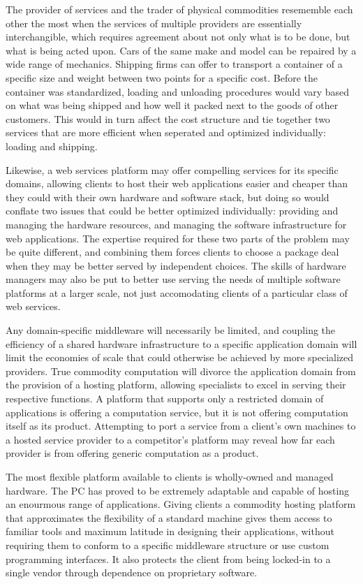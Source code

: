 The provider of services and the trader of physical commodities resememble each other the most when the services of multiple providers are essentially interchangible, which requires agreement about not only what is to be done, but what is being acted upon. Cars of the same make and model can be repaired by a wide range of mechanics. Shipping firms can offer to transport a container of a specific size and weight between two points for a specific cost. Before the container was standardized, loading and unloading procedures would vary based on what was being shipped and how well it packed next to the goods of other customers. This would in turn affect the cost structure and tie together two services that are more efficient when seperated and optimized individually: loading and shipping.

Likewise, a web services platform may offer compelling services for its specific domains, allowing clients to host their web applications easier and cheaper than they could with their own hardware and software stack, but doing so would conflate two issues that could be better optimized individually: providing and managing the hardware resources, and managing the software infrastructure for web applications. The expertise required for these two parts of the problem may be quite different, and combining them forces clients to choose a package deal when they may be better served by independent choices. The skills of hardware managers may also be put to better use serving the needs of multiple software platforms at a larger scale, not just accomodating clients of a particular class of web services.

Any domain-specific middleware will necessarily be limited, and coupling the efficiency of a shared hardware infrastructure to a specific application domain will limit the economies of scale that could otherwise be achieved by more specialized providers. True commodity computation will divorce the application domain from the provision of a hosting platform, allowing specialists to excel in serving their respective functions. A platform that supports only a restricted domain of applications is offering a computation service, but it is not offering computation itself as its product. Attempting to port a service from a client's own machines to a hosted service provider to a competitor's platform may reveal how far each provider is from offering generic computation as a product.

The most flexible platform available to clients is wholly-owned and managed hardware. The PC has proved to be extremely adaptable and capable of hosting an enourmous range of applications. Giving clients a commodity hosting platform that approximates the flexibility of a standard machine gives them access to familiar tools and maximum latitude in designing their applications, without requiring them to conform to a specific middleware structure or use custom programming interfaces. It also protects the client from being locked-in to a single vendor through dependence on proprietary software.


